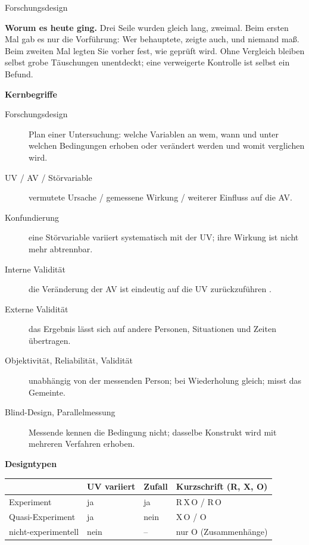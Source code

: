 \begin{handout}{Forschungsdesign}

\textbf{Worum es heute ging.} Drei Seile wurden gleich lang, zweimal. Beim
ersten Mal gab es nur die Vorführung: Wer behauptete, zeigte auch, und
niemand maß. Beim zweiten Mal legten Sie vorher fest, wie geprüft wird.
Ohne Vergleich bleiben selbst grobe Täuschungen unentdeckt; eine
verweigerte Kontrolle ist selbst ein Befund.

\textbf{Kernbegriffe}
\begin{description}
  \item[Forschungsdesign] Plan einer Untersuchung: welche Variablen an
    wem, wann und unter welchen Bedingungen erhoben oder verändert werden
    und womit verglichen wird.
  \item[UV / AV / Störvariable] vermutete Ursache / gemessene Wirkung /
    weiterer Einfluss auf die AV.
  \item[Konfundierung] eine Störvariable variiert systematisch mit der
    UV; ihre Wirkung ist nicht mehr abtrennbar.
  \item[Interne Validität] die Veränderung der AV ist eindeutig auf die
    UV zurückzuführen \parencite{shadish2002experimental}.
  \item[Externe Validität] das Ergebnis lässt sich auf andere Personen,
    Situationen und Zeiten übertragen.
  \item[Objektivität, Reliabilität, Validität] unabhängig von der
    messenden Person; bei Wiederholung gleich; misst das Gemeinte.
  \item[Blind-Design, Parallelmessung] Messende kennen die Bedingung
    nicht; dasselbe Konstrukt wird mit mehreren Verfahren erhoben.
\end{description}

\textbf{Designtypen}

\begin{center}
\small
\begin{tabular}{p{}p{}p{}p{}}
\toprule
& \textbf{UV variiert} & \textbf{Zufall} & \textbf{Kurzschrift (R, X, O)} \\
\midrule
Experiment & ja & ja & R\,X\,O \;/\; R\;\;\,O \\
Quasi-Experiment & ja & nein & \phantom{R\,}X\,O \;/\; \phantom{R\,X\,}O \\
nicht-experimentell & nein & -- & nur O (Zusammenhänge) \\
\bottomrule
\end{tabular}
\end{center}


\end{handout}
